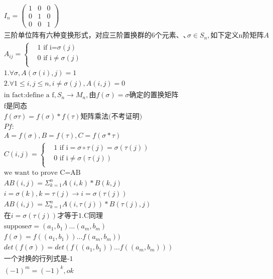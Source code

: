 \documentclass[12pt, a4paper]{article}  %
\begin{document}
\begin{align}
    &I_n=\begin{pmatrix}
        1&0&0\\
        0&1&0\\
        0&0&1
    \end{pmatrix}\\
    &\text{三阶单位阵有六种变换形式，对应三阶置换群的6个元素}、、
    &\sigma\in S_n,\text{如下定义n阶矩阵}A\\
    &A_{ij}=\left\{
        \begin{aligned}
        &1 \text{ if i=}\sigma(j) \\
        &0 \text{ if i}\neq\sigma(j) \\
        \end{aligned}
    \right.\\
    &1.\forall \sigma,A(\sigma(i),j)=1\\
    &2. \forall 1\leqslant i,j\leqslant n,i\neq \sigma(j),A(i,j)=0\\
    &\text{in fact:define a f},S_n\rightarrow M_n,\text{由}f(\sigma)=\sigma\text{确定的置换矩阵}\\
    &\text{f是同态}\\
    & f(\sigma \tau)=f(\sigma)* f(\tau)\text{矩阵乘法(不考证明)}\\
    &Pf:\\
    &A=f(\sigma),B=f(\tau),C=f(\sigma*\tau)\\
    &C(i,j)=\left\{
        \begin{aligned}
        &1 \text{ if i}=\sigma \circ \tau(j)=\sigma(\tau(j)) \\
        &0 \text{ if i}\neq\sigma(\tau(j)) \\
        \end{aligned}
    \right.\\
    &\text{we want to prove C=AB}\\
    &AB(i,j)=\Sigma_{k=1}^n A(i,k)*B(k,j)\\
    &i=\sigma(k),k=\tau(j)\rightarrow i=\sigma(\tau(j))\\
    &AB(i,j)=\Sigma_{k=1}^n A(i,\tau(j))*B(\tau(j),j)\\
    &\text{在}i=\sigma(\tau(j))\text{才等于1.C同理}
    &\\
    &\text{suppose} \sigma=(a_1,b_1)...(a_m,b_m)\\
    &f(\sigma)=f((a_1,b_1))...f(a_m,b_m))\\
    &det(f(\sigma))=det(f((a_1,b_1))...f((a_m,b_m)))\\
    &\text{一个对换的行列式是-1}\\
    &(-1)^{m}=(-1)^{k},ok
\end{align}
\end{document}
